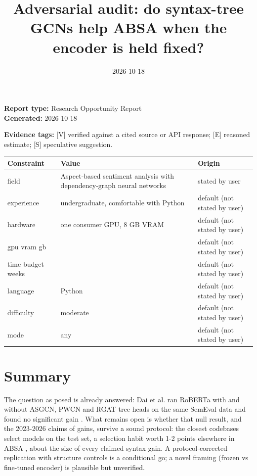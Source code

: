 \documentclass[11pt,a4paper]{article}
\title{Adversarial audit: do syntax-tree GCNs help ABSA when the encoder is held fixed?}
\date{2026-10-18}
\begin{document}
\maketitle


\textbf{Report type:} Research Opportunity Report\\
\textbf{Generated:} 2026-10-18

\textbf{Evidence tags:} [V] verified against a cited source or API response; [E] reasoned estimate; [S] speculative suggestion.

{\small
\begin{longtable}{>{\raggedright\arraybackslash}p{}>{\raggedright\arraybackslash}p{}>{\raggedright\arraybackslash}p{}}
\toprule
\textbf{Constraint} & \textbf{Value} & \textbf{Origin} \\
\midrule
\endhead
field & Aspect-based sentiment analysis with dependency-graph neural networks & stated by user \\
experience & undergraduate, comfortable with Python & default (not stated by user) \\
hardware & one consumer GPU, 8 GB VRAM & default (not stated by user) \\
gpu vram gb & 8 & default (not stated by user) \\
time budget weeks & 8 & default (not stated by user) \\
language & Python & default (not stated by user) \\
difficulty & moderate & default (not stated by user) \\
mode & any & default (not stated by user) \\
\bottomrule
\end{longtable}
}

\section{Summary}

The question as posed is already answered: Dai et al. ran RoBERTa with and without ASGCN, PWCN and RGAT tree heads on the same SemEval data and found no significant gain \cite{dai2021syntax}. What remains open is whether that null result, and the 2023-2026 claims of gains, survive a sound protocol: the closest codebases select models on the test set, a selection habit worth 1-2 points elsewhere in ABSA \cite{mukherjee2021repro}, about the size of every claimed syntax gain. A protocol-corrected replication with structure controls is a conditional go; a novel framing (frozen vs fine-tuned encoder) is plausible but unverified.
\end{document}

